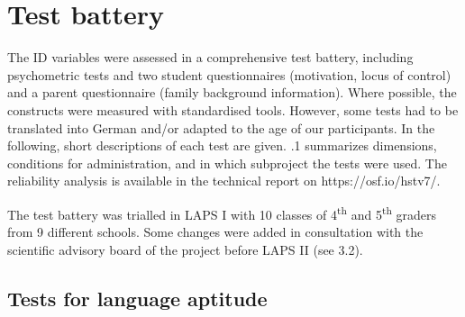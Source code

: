 \documentclass[output=paper]{langsci/langscibook}
\begin{document}
\section{Test battery}

The ID variables were assessed in a comprehensive test battery, including psychometric tests and two student questionnaires (motivation, locus of control) and a parent questionnaire (family background information). Where possible, the constructs were measured with standardised tools. However, some tests had to be translated into German and/or adapted to the age of our participants. In the following, short descriptions of each test are given. .1 summarizes dimensions, conditions for administration, and in which subproject the tests were used. The reliability analysis is available in the technical report on https://osf.io/hstv7/.

The test battery was trialled in LAPS I with 10 classes of 4\textsuperscript{th} and 5\textsuperscript{th} graders from 9 different schools. Some changes were added in consultation with the scientific advisory board of the project before LAPS II (see 3.2).

\subsection{Tests for language aptitude}
\end{document}
